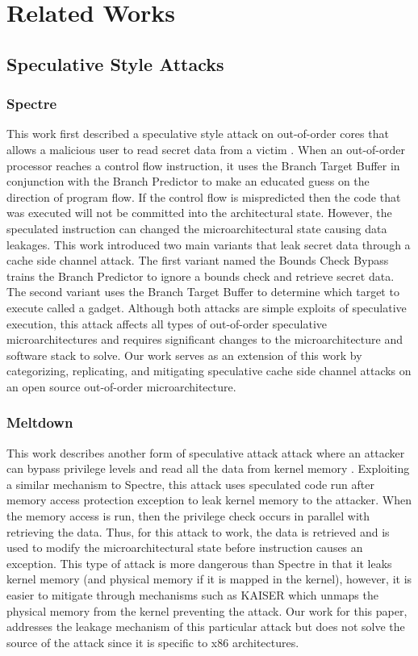 \section{Related Works}

\subsection{Speculative Style Attacks}

\subsubsection{Spectre}

This work first described a speculative style attack on out-of-order cores that 
allows a malicious user to read secret data from a victim \cite{b1}. When an out-of-order 
processor reaches a control flow instruction, it uses the Branch Target Buffer in 
conjunction with the Branch Predictor to make an educated guess on the direction
of program flow. If the control flow is mispredicted then the code that was
executed will not be committed into the architectural state. However, the
speculated instruction can changed the microarchitectural state causing data
leakages. This work introduced two main variants that leak secret data through
a cache side channel attack. The first variant named the Bounds Check Bypass
trains the Branch Predictor to ignore a bounds check and retrieve secret data. The
second variant uses the Branch Target Buffer to determine which target to execute
called a gadget. Although both attacks are simple exploits of speculative execution,
this attack affects all types of out-of-order speculative microarchitectures 
and requires significant changes to the microarchitecture and software stack to solve.
Our work serves as an extension of this work by categorizing, replicating, and mitigating
speculative cache side channel attacks on an open source out-of-order microarchitecture.

\subsubsection{Meltdown}

This work describes another form of speculative attack attack where an attacker 
can bypass privilege levels and read all the data from kernel memory \cite{b2}. Exploiting a 
similar mechanism to Spectre, this attack uses speculated code run after memory access
protection exception to leak kernel memory to the attacker. When the memory access
is run, then the privilege check occurs in parallel with retrieving the data. Thus,
for this attack to work, the data is retrieved and is used to modify the 
microarchitectural state before instruction causes an exception. This type of attack
is more dangerous than Spectre in that it leaks kernel memory (and physical memory if
it is mapped in the kernel), however, it is easier to mitigate through mechanisms such
as KAISER \cite{b53} which unmaps the physical memory from the kernel preventing the attack.
Our work for this paper, addresses the leakage mechanism of this particular attack but 
does not solve the source of the attack since it is specific to x86 architectures.

